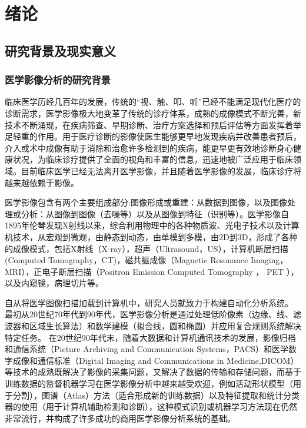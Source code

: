 \chapter{绪论}
\label{chap:introduction}

\section{研究背景及现实意义}
\subsection{医学影像分析的研究背景}

临床医学历经几百年的发展，传统的“视、触、叩、听”已经不能满足现代化医疗的诊断需求，医学影像极大地变革了传统的诊疗体系，成熟的成像模式不断完善，新技术不断涌现，在疾病筛查、早期诊断、治疗方案选择和预后评估等方面发挥着举足轻重的作用。用于医疗诊断的影像使医生能够更早地发现疾病并改善患者预后，介入或术中成像有助于消除和治愈许多检测到的疾病，能更早更有效地诊断身心健康状况，为临床诊疗提供了全面的视角和丰富的信息，迅速地被广泛应用于临床领域。目前临床医学已经无法离开医学影像，并且随着医学影像的发展，临床诊疗将越来越依赖于影像。

医学影像包含有两个主要组成部分:图像形成或重建：从数据到图像，以及图像处理或分析：从图像到图像（去噪等）以及从图像到特征（识别等）。医学影像自1895年伦琴发现X射线以来，综合利用物理中的各种物质波、光电子技术以及计算机技术，从宏观到微观，由静态到动态，由单模到多模，由2D到3D，形成了各种的成像模式，包括X射线（X-ray），超声（Ultrasound，US），计算机断层扫描(Computed Tomography，CT)，磁共振成像（Magnetic Resonance Imaging，MRI），正电子断层扫描（Positron Emission Computed Tomography ， PET ），以及内窥镜，病理切片等。

自从将医学图像扫描加载到计算机中，研究人员就致力于构建自动化分析系统。 最初从20世纪70年代到90年代，医学影像分析是通过处理低阶像素（边缘、线、滤波器和区域生长算法）和数学建模（拟合线，圆和椭圆）并应用复合规则系统解决特定任务。
在20世纪90年代末，随着大数据和计算机通讯技术的发展，影像归档和通信系统（Picture Archiving and Communication Systems，PACS）和医学数字成像和通信标准（Digital Imaging and Communications in Medicine,DICOM）等技术的成熟既解决了影像的采集问题，又解决了数据的传输和存储问题，而基于训练数据的监督机器学习在医学影像分析中越来越受欢迎，例如活动形状模型（用于分割），图谱（Atlas）方法（适合形成新的训练数据）以及特征提取和统计分类器的使用（用于计算机辅助检测和诊断），这种模式识别或机器学习方法现在仍然非常流行，并构成了许多成功的商用医学影像分析系统的基础。


